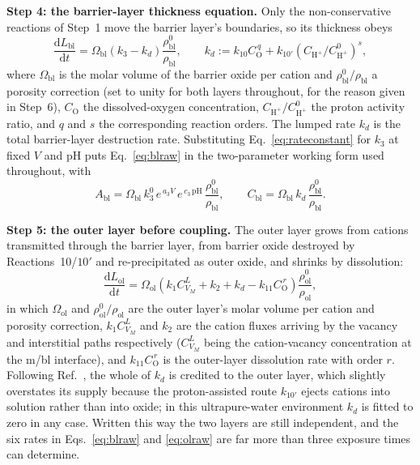 \documentclass[pdflatex,sn-nature]{sn-jnl}
\begin{document}
\textbf{Step 4: the barrier-layer thickness equation.} Only the
non-conservative reactions of Step~1 move the barrier layer's
boundaries, so its thickness obeys
\begin{equation}
\frac{\mathrm{d}L_\text{bl}}{\mathrm{d}t}
= \Omega_\text{bl}\left(k_3 - k_d\right)
\frac{\rho^0_\text{bl}}{\rho_\text{bl}},
\qquad
k_d := k_{10} C_\mathrm{O}^{\,q}
+ k_{10'}\left(C_{\mathrm{H}^+}/C^0_{\mathrm{H}^+}\right)^{s},
\label{eq:blraw}
\end{equation}
where $\Omega_\text{bl}$ is the molar volume of the barrier oxide per
cation and $\rho^0_\text{bl}/\rho_\text{bl}$ a porosity correction
(set to unity for both layers throughout, for the reason given in
Step~6),
$C_\mathrm{O}$ the dissolved-oxygen concentration,
$C_{\mathrm{H}^+}/C^0_{\mathrm{H}^+}$ the proton activity ratio, and
$q$ and $s$ the corresponding reaction orders. The lumped rate $k_d$ is
the total barrier-layer destruction rate. Substituting
Eq.~\eqref{eq:rateconstant} for $k_3$ at fixed $V$ and pH puts
Eq.~\eqref{eq:blraw} in the two-parameter working form used throughout,
with
\begin{equation}
A_\text{bl} = \Omega_\text{bl}\, k_3^{0}\, e^{\,a_3 V}\,
e^{\,c_3\,\mathrm{pH}}\, \frac{\rho^0_\text{bl}}{\rho_\text{bl}},
\qquad
C_\text{bl} = \Omega_\text{bl}\, k_d\,
\frac{\rho^0_\text{bl}}{\rho_\text{bl}} .
\label{eq:AblCbl}
\end{equation}

\textbf{Step 5: the outer layer before coupling.} The outer layer grows
from cations transmitted through the barrier layer, from barrier oxide
destroyed by Reactions~10/$10'$ and re-precipitated as outer oxide, and
shrinks by dissolution:
\begin{equation}
\frac{\mathrm{d}L_\text{ol}}{\mathrm{d}t}
= \Omega_\text{ol}\left(k_1 C_{V_M}^{L} + k_2 + k_d
- k_{11} C_\mathrm{O}^{\,r}\right)
\frac{\rho^0_\text{ol}}{\rho_\text{ol}},
\label{eq:olraw}
\end{equation}
in which $\Omega_\text{ol}$ and $\rho^0_\text{ol}/\rho_\text{ol}$ are
the outer layer's molar volume per cation and porosity correction,
$k_1 C_{V_M}^{L}$ and $k_2$ are the cation fluxes arriving by the
vacancy and interstitial paths respectively ($C_{V_M}^{L}$ being the
cation-vacancy concentration at the m/bl interface), and
$k_{11} C_\mathrm{O}^{\,r}$ is the outer-layer dissolution rate with
order $r$. Following Ref.~\citep{li2020scwpdm}, the whole of $k_d$ is
credited to the outer layer, which slightly overstates its supply
because the proton-assisted route $k_{10'}$ ejects cations into solution
rather than into oxide; in this ultrapure-water environment $k_d$ is
fitted to zero in any case. Written this way the two layers are still independent, and
the six rates in Eqs.~\eqref{eq:blraw} and \eqref{eq:olraw} are far more
than three exposure times can determine.
\end{document}
